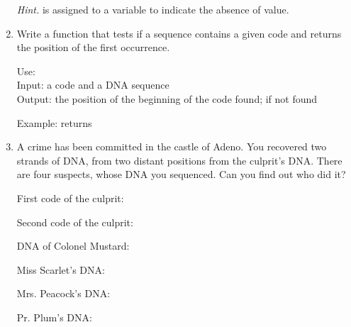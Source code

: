 \documentclass[11pt,class=report,crop=false]{standalone}
\begin{document}
\begin{activite}[DNA]
\begin{enumerate}
  \emph{Hint.}  is assigned to a variable to indicate the absence of value. 
  
\medskip
   
  \item Write a function  that tests if a sequence contains a given code and returns the position of the first occurrence.
  
   \medskip
   
  \begin{fonction}[\ci{position()}]
  Use:  \\
  Input: a code and a DNA sequence \\
  Output: the position of the beginning of the code found;  if not found
  
  \medskip
    
  Example:  returns 
  \end{fonction}
  
    \medskip
  
  \item A crime has been committed in the castle of Adeno. 
You recovered two strands of DNA, from two distant positions from the culprit's DNA. There are four suspects, whose DNA you sequenced.
Can you find out who did it?

First code of the culprit:  

Second code of the culprit: 

\medskip

{\footnotesize
DNA of Colonel Mustard:


Miss Scarlet's DNA:



Mrs. Peacock's DNA:


Pr. Plum's DNA:


}
\end{enumerate}
\end{activite}


\end{document}
